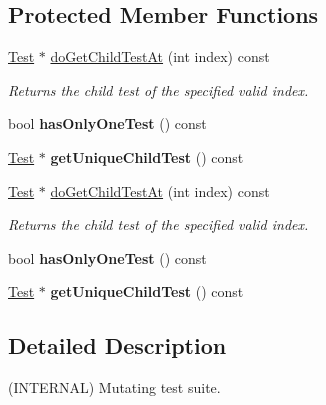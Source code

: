 \subsection*{Protected Member Functions}
\begin{DoxyCompactItemize}
\item 
\hyperlink{class_test}{Test} $\ast$ \hyperlink{class_test_runner_1_1_wrapping_suite_a6fb842923093bf03c43cb69041b50e52}{do\+Get\+Child\+Test\+At} (int index) const 
\begin{DoxyCompactList}\small\item\em Returns the child test of the specified valid index. \end{DoxyCompactList}\item 
\hypertarget{class_test_runner_1_1_wrapping_suite_af38cfc83ff00ccc6231e479874931d04}{bool {\bfseries has\+Only\+One\+Test} () const }\label{class_test_runner_1_1_wrapping_suite_af38cfc83ff00ccc6231e479874931d04}

\item 
\hypertarget{class_test_runner_1_1_wrapping_suite_a2119565585a0963d78ad4bfccb92ee93}{\hyperlink{class_test}{Test} $\ast$ {\bfseries get\+Unique\+Child\+Test} () const }\label{class_test_runner_1_1_wrapping_suite_a2119565585a0963d78ad4bfccb92ee93}

\item 
\hyperlink{class_test}{Test} $\ast$ \hyperlink{class_test_runner_1_1_wrapping_suite_a84e5ef67fbdd8beec998923532849cb5}{do\+Get\+Child\+Test\+At} (int index) const 
\begin{DoxyCompactList}\small\item\em Returns the child test of the specified valid index. \end{DoxyCompactList}\item 
\hypertarget{class_test_runner_1_1_wrapping_suite_af38cfc83ff00ccc6231e479874931d04}{bool {\bfseries has\+Only\+One\+Test} () const }\label{class_test_runner_1_1_wrapping_suite_af38cfc83ff00ccc6231e479874931d04}

\item 
\hypertarget{class_test_runner_1_1_wrapping_suite_a6ca61a2aa4d3832525333fef9ccad961}{\hyperlink{class_test}{Test} $\ast$ {\bfseries get\+Unique\+Child\+Test} () const }\label{class_test_runner_1_1_wrapping_suite_a6ca61a2aa4d3832525333fef9ccad961}

\end{DoxyCompactItemize}


\subsection{Detailed Description}
(I\+N\+T\+E\+R\+N\+A\+L) Mutating test suite. 

